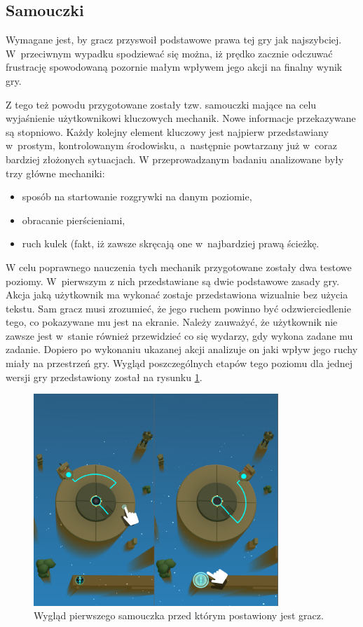 \documentclass[a4paper,12pt,numbers=noenddot]{report}
\begin{document}
	\subsection{Samouczki}
Wymagane jest, by gracz przyswoił podstawowe prawa tej gry jak najszybciej. W~przeciwnym wypadku spodziewać się można, iż prędko zacznie odczuwać frustrację spowodowaną pozornie małym wpływem jego akcji na finalny wynik gry. 

Z tego też powodu przygotowane zostały tzw. samouczki mające na celu wyjaśnienie użytkownikowi kluczowych mechanik. Nowe informacje przekazywane są stopniowo. Każdy kolejny element kluczowy jest najpierw przedstawiany w~prostym, kontrolowanym środowisku, a~następnie powtarzany już w~coraz bardziej złożonych sytuacjach. 
W przeprowadzanym badaniu analizowane były trzy główne mechaniki: 
\begin{itemize}
\item sposób na startowanie rozgrywki na danym poziomie, 
\item obracanie pierścieniami,
\item ruch kulek (fakt, iż zawsze skręcają one w~najbardziej prawą ścieżkę.
\end{itemize}

W celu poprawnego nauczenia tych mechanik przygotowane zostały dwa testowe poziomy. W~pierwszym z nich przedstawiane są dwie podstawowe zasady gry. Akcja jaką użytkownik ma wykonać zostaje przedstawiona wizualnie bez użycia tekstu. Sam gracz musi zrozumieć, że jego ruchem powinno być odzwierciedlenie tego, co pokazywane mu jest na ekranie. Należy zauważyć, że użytkownik nie zawsze jest w~stanie również przewidzieć co się wydarzy, gdy wykona zadane mu zadanie. Dopiero po wykonaniu ukazanej akcji analizuje on jaki wpływ jego ruchy miały na przestrzeń gry.
Wygląd poszczególnych etapów tego poziomu dla jednej wersji gry przedstawiony został na rysunku \ref{fig:tut_L1_1}.

\begin{figure}[h!]
	\centering
  	\includegraphics[height=8cm]{fig/tut1.jpg}
	\caption{Wygląd pierwszego samouczka przed którym postawiony jest gracz.}
	\label{fig:tut_L1_1}
\end{figure}
\end{document}
